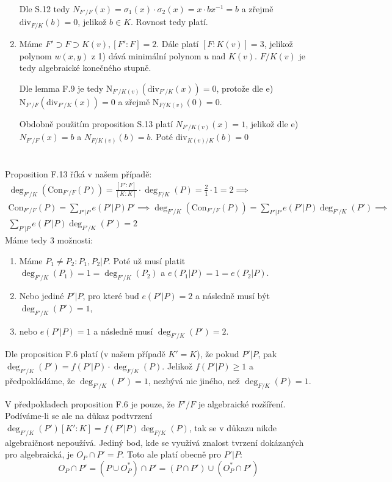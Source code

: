 \documentclass[12pt, a4paper]{article}
\begin{document}
\begin{enumerate}[label=(\alph*)]
    Dle S.12 tedy $N_{F'/F}(x)=\sigma_1(x)\cdot \sigma_2(x) = x \cdot bx^{-1} = b$ a zřejmě $\text{div}_{F/K}(b) = 0$, jelikož $b \in K$. Rovnost tedy platí.

    \item Máme $F' \supset F \supset K(v), [F':F]=2$. Dále platí $[F:K(v)]=3$, jelikož polynom $w(x,y)$ z 1) dává minimální polynom $u$ nad $K(v)$. $F/K(v)$ je tedy algebraické konečného stupně.

    Dle lemma F.9 je tedy $\text{N}_{F'/K(v)}(\text{div}_{F'/K}(x)) = 0$, protože dle e) $\text{N}_{F'/F}(\text{div}_{F'/K}(x)) = 0$ a zřejmě $\text{N}_{F/K(v)}(0) = 0$. 

    Obdobně použitím proposition S.13 platí $N_{F'/K(v)}(x) = 1$, jelikož dle e) $N_{F'/F}(x) = b$ a $N_{F/K(v)}(b) = b$. Poté $\text{div}_{K(v)/K}(b) = 0$
\end{enumerate}

\section{}
Proposition F.13 říká v našem případě:
\begin{gather*}
\deg_{F'/K}(\text{Con}_{F'/F}(P)) = \frac{[F':F]}{[K:K]}\cdot \deg_{F/K}(P) = \frac{2}{1} \cdot 1 = 2 \implies\\
\text{Con}_{F'/F}(P) = \sum\limits_{P'|P}e(P'|P)P' \implies \deg_{F'/K}(\text{Con}_{F'/F}(P)) = \sum\limits_{P'|P}e(P'|P)\deg_{F'/K}(P') \implies\\
\sum\limits_{P'|P}e(P'|P)\deg_{F'/K}(P') = 2
\end{gather*}
Máme tedy 3 možnosti:

\begin{enumerate}
    \item Máme $P_1 \neq P_2: P_1, P_2 | P$. Poté už musí platit $\deg_{F'/K}(P_1)=1=\deg_{F'/K}(P_2)$ a $e(P_1|P)=1=e(P_2|P)$.
    \item Nebo jediné $P' | P$, pro které buď $e(P'|P)=2$ a následně musí být $\deg_{F'/K}(P')=1$,
    \item nebo $e(P'|P)=1$ a následně musí $\deg_{F'/K}(P')=2$.
\end{enumerate}

Dle proposition F.6 platí (v našem případě $K'=K$), že pokud $P'|P$, pak $\deg_{F'/K}(P') = f(P'|P)\cdot \deg_{F/K}(P)$. Jelikož $f(P'|P) \geq 1$ a předpokládáme, že $\deg_{F'/K}(P')=1$, nezbývá nic jiného, než $\deg_{F/K}(P) = 1$.

V předpokladech proposition F.6 je pouze, že $F'/F$ je algebraické rozšíření. Podíváme-li se ale na důkaz podtvrzení $\deg_{F'/K}(P')[K':K] = f(P'|P)\deg_{F/K}(P)$, tak se v důkazu nikde algebraičnost nepoužívá. Jediný bod, kde se využívá znalost tvrzení dokázaných pro algebraická, je $O_P \cap P' = P$. Toto ale platí obecně pro $P'|P$:
\[O_P \cap P' = (P \cup O^*_P) \cap P' = (P \cap P') \cup (O^*_P \cap P') \]
\end{document}
